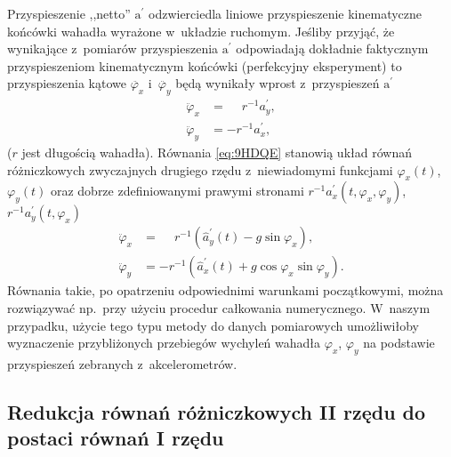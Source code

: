 \documentclass[paper=a4,DIV=12]{lpas}
\newcommand{\brm}[1]{\bm{\mathrm{#1}}}
\begin{document}
\begin{appendices}
Przyspieszenie ,,netto'' $\brm{a}^{\prime}$ odzwierciedla liniowe
przyspieszenie kinematyczne końcówki wahadła wyrażone w~układzie ruchomym.
Jeśliby przyjąć, że wynikające z~pomiarów przyspieszenia $\brm{a}^{\prime}$
odpowiadają dokładnie faktycznym przyspieszeniom kinematycznym końcówki
(perfekcyjny eksperyment) to przyspieszenia kątowe $\ddot{\varphi_x}$
i~$\ddot{\varphi_y}$ będą wynikały wprost z~przyspieszeń $\brm{a}^{\prime}$
\begin{subequations}
  \label{eq:9HDQE}
  \begin{align}
    \ddot{\varphi}_x &=\phantom{-}r^{-1} a_y^{\prime},
    \label{eq:UIQUR}
    \\
    \ddot{\varphi}_y &=         - r^{-1} a_x^{\prime},
    \label{eq:ZBLRS}
  \end{align}
\end{subequations}
($r$ jest długością wahadła). Równania \eqref{eq:9HDQE} stanowią
układ równań różniczkowych zwyczajnych drugiego rzędu z~niewiadomymi funkcjami
$\varphi_x(t)$, $\varphi_y(t)$ oraz dobrze zdefiniowanymi prawymi stronami
$r^{-1}a_x^{\prime}(t,\varphi_x,\varphi_y)$, $r^{-1}a_y^{\prime}(t,\varphi_x)$
\begin{subequations}
  \label{eq:ROGUO}
  \begin{align}
    \ddot{\varphi}_x & = \phantom{-} r^{-1} \left(
      \hat{a}_y^{\prime}\left(t\right) - g \sin{\varphi_x}
    \right),
    \label{eq:HRYMM}
    \\
    \ddot{\varphi}_y & = - r^{-1} \left(
        \hat{a}_x^{\prime}\left(t\right) + g \cos{\varphi_x} \sin{\varphi_y}
    \right).
    \label{eq:D4N2B}
  \end{align}
\end{subequations}
Równania takie, po opatrzeniu odpowiednimi warunkami początkowymi, można
rozwiązywać np.~przy użyciu procedur całkowania numerycznego. W~naszym
przypadku, użycie tego typu metody do danych pomiarowych umożliwiłoby
wyznaczenie przybliżonych przebiegów wychyleń wahadła $\varphi_x$, $\varphi_y$
na podstawie przyspieszeń zebranych z~akcelerometrów.

\subsection{Redukcja równań różniczkowych II rzędu do postaci równań I rzędu}
\label{sec:WKKBB}


\end{appendices}
\end{document}

